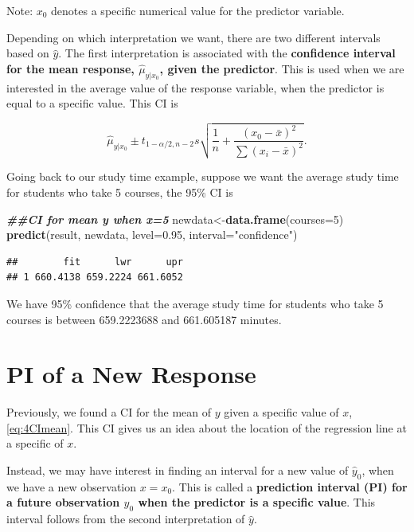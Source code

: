 \documentclass[
]{book}
\newenvironment{Shaded}{\begin{snugshade}}{\end{snugshade}}
\newcommand{\AttributeTok}[1]{\textcolor[rgb]{0.13,0.29,0.53}{#1}}
\newcommand{\DecValTok}[1]{\textcolor[rgb]{0.00,0.00,0.81}{#1}}
\newcommand{\DocumentationTok}[1]{\textcolor[rgb]{0.56,0.35,0.01}{\textbf{\textit{#1}}}}
\newcommand{\FloatTok}[1]{\textcolor[rgb]{0.00,0.00,0.81}{#1}}
\newcommand{\FunctionTok}[1]{\textcolor[rgb]{0.13,0.29,0.53}{\textbf{#1}}}
\newcommand{\NormalTok}[1]{#1}
\newcommand{\OtherTok}[1]{\textcolor[rgb]{0.56,0.35,0.01}{#1}}
\newcommand{\StringTok}[1]{\textcolor[rgb]{0.31,0.60,0.02}{#1}}
\begin{document}
Note: \(x_0\) denotes a specific numerical value for the predictor variable.

Depending on which interpretation we want, there are two different intervals based on \(\hat{y}\). The first interpretation is associated with the \textbf{confidence interval for the mean response, \(\hat{\mu}_{y|x_0}\), given the predictor}. This is used when we are interested in the average value of the response variable, when the predictor is equal to a specific value. This CI is

\begin{equation} 
\hat{\mu}_{y|x_0}\pm t_{1-\alpha/2,n-2}s\sqrt{\frac{1}{n} +
\frac{(x_0-\bar{x})^2}{\sum(x_i-\bar{x})^2}}.
\label{eq:4CImean}
\end{equation}

Going back to our study time example, suppose we want the average study time for students who take 5 courses, the 95\% CI is

\begin{Shaded}
\begin{Highlighting}[]
\DocumentationTok{\#\#CI for mean y when x=5}
\NormalTok{newdata}\OtherTok{\textless{}{-}}\FunctionTok{data.frame}\NormalTok{(}\AttributeTok{courses=}\DecValTok{5}\NormalTok{)}
\FunctionTok{predict}\NormalTok{(result, newdata, }\AttributeTok{level=}\FloatTok{0.95}\NormalTok{, }\AttributeTok{interval=}\StringTok{"confidence"}\NormalTok{)}
\end{Highlighting}
\end{Shaded}

\begin{verbatim}
##        fit      lwr      upr
## 1 660.4138 659.2224 661.6052
\end{verbatim}

We have 95\% confidence that the average study time for students who take 5 courses is between 659.2223688 and 661.605187 minutes.

\section{PI of a New Response}\label{pi-of-a-new-response}

Previously, we found a CI for the mean of \(y\) given a specific value of \(x\), \eqref{eq:4CImean}. This CI gives us an idea about the location of the regression line at a specific of \(x\).

Instead, we may have interest in finding an interval for a new value of \(\hat{y}_0\), when we have a new observation \(x=x_0\). This is called a \textbf{prediction interval (PI) for a future observation \(y_0\) when the predictor is a specific value}. This interval follows from the second interpretation of \(\hat{y}\).
\end{document}
